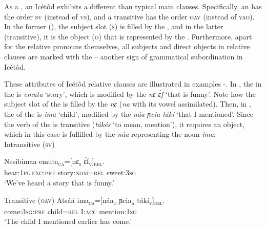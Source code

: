 As a , an Icétôd  exhibits a different  than typical main clauses. Specifically, an   has the order \textsc{sv} (instead of \textsc{vs}), and a transitive  has the order \textsc{oav} (instead of \textsc{vao}). In the former (), the subject slot (\textsc{s}) is filled by the , and in the latter (transitive), it is the object (\textsc{o}) that is represented by the . Furthermore, apart for the relative pronouns themselves, all subjects and direct objects in relative clauses are marked with the  – another sign of grammatical subordination in Icétôd.

These attributes of Icétôd relative clauses are illustrated in examples -. In , the  in the  is \textit{emuta} ‘story’, which is modified by the  \textit{nɛ \'{ɛ}f} ‘that is funny’. Note how the subject slot of the  is filled by the  \textit{nɛ} (\textit{na} with its vowel assimilated). Then, in , the  of the  is \textit{ima} ‘child’, modified by the  \textit{náa ɲcia tákí} ‘that I mentioned’. Since the verb of the  is transitive (\textit{tákés} ‘to mean, mention’), it requires an object, which in this case is fulfilled by the  \textit{náa} representing the noun \textit{ima}:\\




Intransitive (\textsc{sv})

\ea\label{ex:syn:35}
\gll Nesíbimaa     emuta\textsc{\textsubscript{ca}}=[nɛ\textsc{\textsubscript{s}}   \'{ɛ}f\textsc{\textsubscript{v}}{]}\textsc{\textsubscript{rel}}. \\
hear:\textsc{1pl.exc:prf}  story:\textsc{nom}=\textsc{rel}   sweet:\textsc{3sg}    \\
\glt ‘We’ve heard a story that is funny.’ 
\z


Transitive (\textsc{oav})
\ea\label{ex:syn:36}
\gll Atsáá       ima\textsc{\textsubscript{ca}}=[náa\textsc{\textsubscript{o}}   ɲcia\textsc{\textsubscript{a}}   tákí\textsc{\textsubscript{v}}{]}\textsc{\textsubscript{rel}}. \\
come:\textsc{3sg}:\textsc{prf}   child=\textsc{rel}   I:\textsc{acc}   mention:\textsc{1sg}    \\
\glt ‘The child I mentioned earlier has come.’ 
\z




